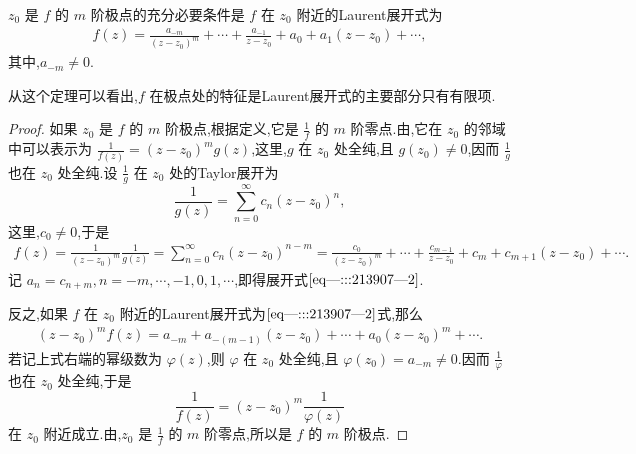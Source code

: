 \documentclass[../../main.tex]{subfiles}
\begin{document}
\begin{theorem}\label{theorem:定理5.2.4}
\( z_0 \) 是 \( f \) 的 \( m \) 阶极点的充分必要条件是 \( f \) 在 \( z_0 \) 附近的Laurent展开式为
\begin{align}
f(z) = \frac{a_{-m}}{(z - z_0)^m} + \cdots + \frac{a_{-1}}{z - z_0} + a_0 + a_1(z - z_0) + \cdots, \label{eq---:::213907---2}
\end{align}
其中,\( a_{-m} \neq 0 \).
\end{theorem}
\begin{remark}
从这个定理可以看出,\( f \) 在极点处的特征是Laurent展开式的主要部分只有有限项.
\end{remark}
\begin{proof}
如果 \( z_0 \) 是 \( f \) 的 \( m \) 阶极点,根据定义,它是 \( \frac{1}{f} \) 的 \( m \) 阶零点.由,它在 \( z_0 \) 的邻域中可以表示为 \( \frac{1}{f(z)} = (z - z_0)^m g(z) \),这里,\( g \) 在 \( z_0 \) 处全纯,且 \( g(z_0) \neq 0 \),因而 \( \frac{1}{g} \) 也在 \( z_0 \) 处全纯.设 \( \frac{1}{g} \) 在 \( z_0 \) 处的Taylor展开为
\[
\frac{1}{g(z)} = \sum_{n=0}^{\infty} c_n (z - z_0)^n,
\]
这里,\( c_0 \neq 0 \),于是
\begin{align*}
f(z) = \frac{1}{(z - z_0)^m} \frac{1}{g(z)} = \sum_{n=0}^{\infty} c_n (z - z_0)^{n - m} = \frac{c_0}{(z - z_0)^m} + \cdots + \frac{c_{m - 1}}{z - z_0} + c_m + c_{m + 1}(z - z_0) + \cdots.
\end{align*}
记 \( a_n = c_{n + m}, n = -m, \cdots, -1, 0, 1, \cdots \),即得展开式\(\eqref{eq---:::213907---2}\).

反之,如果 \( f \) 在 \( z_0 \) 附近的Laurent展开式为\(\eqref{eq---:::213907---2}\)式,那么
\begin{align*}
(z - z_0)^m f(z) = a_{-m} + a_{-(m - 1)}(z - z_0) + \cdots + a_0(z - z_0)^m + \cdots.
\end{align*}
若记上式右端的幂级数为 \( \varphi(z) \),则 \( \varphi \) 在 \( z_0 \) 处全纯,且 \( \varphi(z_0) = a_{-m} \neq 0 \).因而 \( \frac{1}{\varphi} \) 也在 \( z_0 \) 处全纯,于是
\[
\frac{1}{f(z)} = (z - z_0)^m \frac{1}{\varphi(z)}
\]
在 \( z_0 \) 附近成立.由,\( z_0 \) 是 \( \frac{1}{f} \) 的 \( m \) 阶零点,所以是 \( f \) 的 \( m \) 阶极点.

\end{proof}
\end{document}
